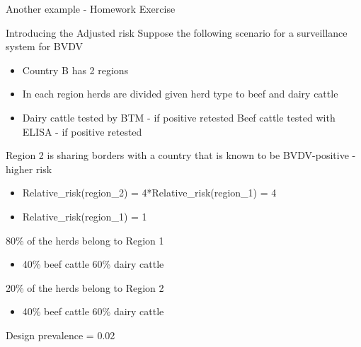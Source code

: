 \documentclass[
  ignorenonframetext,
]{beamer}
\providecommand{\tightlist}{%
  \setlength{\itemsep}{0pt}\setlength{\parskip}{0pt}}
\begin{document}
\begin{frame}{Another example - Homework Exercise}
\protect\hypertarget{another-example---homework-exercise}{}
\begin{block}{Introducing the Adjusted risk}
\protect\hypertarget{introducing-the-adjusted-risk}{}
Suppose the following scenario for a surveillance system for BVDV

\begin{itemize}
\tightlist
\item
  Country B has 2 regions
\item
  In each region herds are divided given herd type to beef and dairy
  cattle
\item
  Dairy cattle tested by BTM - if positive retested \textbar{} Beef
  cattle tested with ELISA - if positive retested
\end{itemize}

Region 2 is sharing borders with a country that is known to be
BVDV-positive - higher risk

\begin{itemize}
\tightlist
\item
  Relative\_risk(region\_2) = 4*Relative\_risk(region\_1) = 4
\item
  Relative\_risk(region\_1) = 1
\end{itemize}

80\% of the herds belong to Region 1

\begin{itemize}
\tightlist
\item
  40\% beef cattle \textbar{} 60\% dairy cattle
\end{itemize}

20\% of the herds belong to Region 2

\begin{itemize}
\tightlist
\item
  40\% beef cattle \textbar{} 60\% dairy cattle
\end{itemize}

Design prevalence = 0.02
\end{block}
\end{frame}
\end{document}

